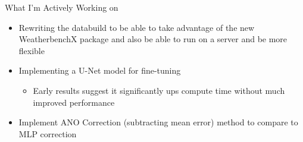 \documentclass[aspectratio=169, xcolor=dvipsnames]{beamer}
\begin{document}
\begin{frame}{What I'm Actively Working on}
\begin{itemize}
    \item Rewriting the databuild to be able to take advantage of the new WeatherbenchX package and also be able to run on a server and be more flexible
    \item Implementing a U-Net model for fine-tuning
    \begin{itemize}
        \item Early results suggest it significantly ups compute time without much improved performance
    \end{itemize}
    \item Implement ANO Correction (subtracting mean error) method to compare to MLP correction
\end{itemize}
\end{frame}
\end{document}
